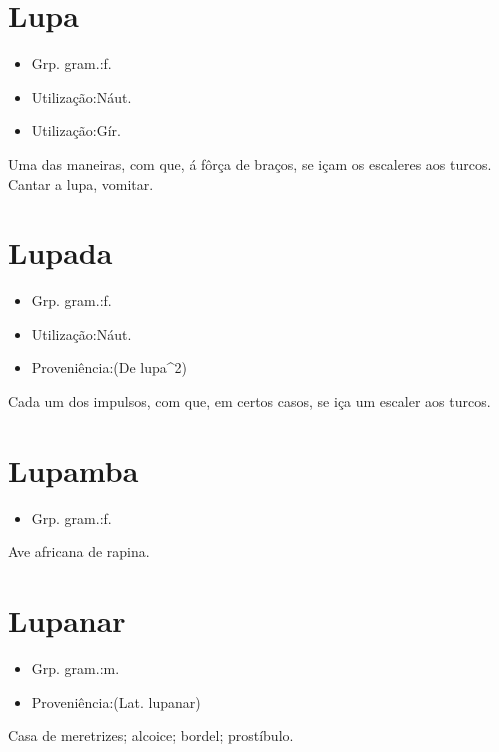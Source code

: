 \section{Lupa}
\begin{itemize}
\item {Grp. gram.:f.}
\end{itemize}
\begin{itemize}
\item {Utilização:Náut.}
\end{itemize}
\begin{itemize}
\item {Utilização:Gír.}
\end{itemize}
Uma das maneiras, com que, á fôrça de braços, se içam os escaleres aos turcos.
\textunderscore Cantar a lupa\textunderscore , vomitar.
\section{Lupada}
\begin{itemize}
\item {Grp. gram.:f.}
\end{itemize}
\begin{itemize}
\item {Utilização:Náut.}
\end{itemize}
\begin{itemize}
\item {Proveniência:(De \textunderscore lupa\textunderscore ^2)}
\end{itemize}
Cada um dos impulsos, com que, em certos casos, se iça um escaler aos turcos.
\section{Lupamba}
\begin{itemize}
\item {Grp. gram.:f.}
\end{itemize}
Ave africana de rapina.
\section{Lupanar}
\begin{itemize}
\item {Grp. gram.:m.}
\end{itemize}
\begin{itemize}
\item {Proveniência:(Lat. \textunderscore lupanar\textunderscore )}
\end{itemize}
Casa de meretrizes; alcoice; bordel; prostíbulo.
